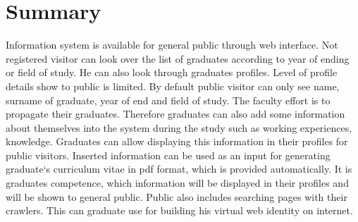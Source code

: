 \documentclass{iitsrc}[2006/14/02]
\begin{document}
\section{Summary}


Information system is available for general public through web interface. Not registered visitor can look over the list of graduates according to year of ending or field of study. He can also look through graduates profiles. Level of profile details show to public is limited. By default public visitor can only see name, surname of graduate, year of end and field of study. The faculty effort is to propagate their graduates. Therefore graduates can also add some information about themselves into the system during the study such as working experiences, knowledge. Graduates can allow displaying this information in their profiles for public visitors. Inserted information can be used as an input for generating graduate`s curriculum vitae in pdf format, which is provided automatically. It is graduates competence, which information will be displayed in their profiles and will be shown to general public. Public also includes searching pages with their crawlers. This can graduate use for building his virtual web identity on internet. 
\end{document}
